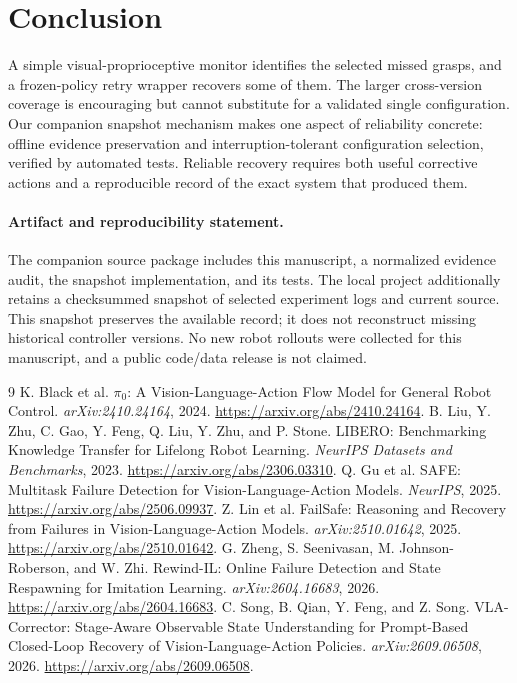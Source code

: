 \documentclass[10pt,twocolumn]{article}
\begin{document}
\section{Conclusion}
A simple visual-proprioceptive monitor identifies the selected missed grasps, and a frozen-policy retry wrapper recovers some of them. The larger cross-version coverage is encouraging but cannot substitute for a validated single configuration. Our companion snapshot mechanism makes one aspect of reliability concrete: offline evidence preservation and interruption-tolerant configuration selection, verified by automated tests. Reliable recovery requires both useful corrective actions and a reproducible record of the exact system that produced them.

\paragraph{Artifact and reproducibility statement.}
The companion source package includes this manuscript, a normalized evidence audit, the snapshot implementation, and its tests. The local project additionally retains a checksummed snapshot of selected experiment logs and current source. This snapshot preserves the available record; it does not reconstruct missing historical controller versions. No new robot rollouts were collected for this manuscript, and a public code/data release is not claimed.

\begin{thebibliography}{9}\small
{} K. Black et al. $\pi_0$: A Vision-Language-Action Flow Model for General Robot Control. \emph{arXiv:2410.24164}, 2024. \url{https://arxiv.org/abs/2410.24164}.
 B. Liu, Y. Zhu, C. Gao, Y. Feng, Q. Liu, Y. Zhu, and P. Stone. LIBERO: Benchmarking Knowledge Transfer for Lifelong Robot Learning. \emph{NeurIPS Datasets and Benchmarks}, 2023. \url{https://arxiv.org/abs/2306.03310}.
 Q. Gu et al. SAFE: Multitask Failure Detection for Vision-Language-Action Models. \emph{NeurIPS}, 2025. \url{https://arxiv.org/abs/2506.09937}.
 Z. Lin et al. FailSafe: Reasoning and Recovery from Failures in Vision-Language-Action Models. \emph{arXiv:2510.01642}, 2025. \url{https://arxiv.org/abs/2510.01642}.
 G. Zheng, S. Seenivasan, M. Johnson-Roberson, and W. Zhi. Rewind-IL: Online Failure Detection and State Respawning for Imitation Learning. \emph{arXiv:2604.16683}, 2026. \url{https://arxiv.org/abs/2604.16683}.
 C. Song, B. Qian, Y. Feng, and Z. Song. VLA-Corrector: Stage-Aware Observable State Understanding for Prompt-Based Closed-Loop Recovery of Vision-Language-Action Policies. \emph{arXiv:2609.06508}, 2026. \url{https://arxiv.org/abs/2609.06508}.
\end{thebibliography}
\end{document}
